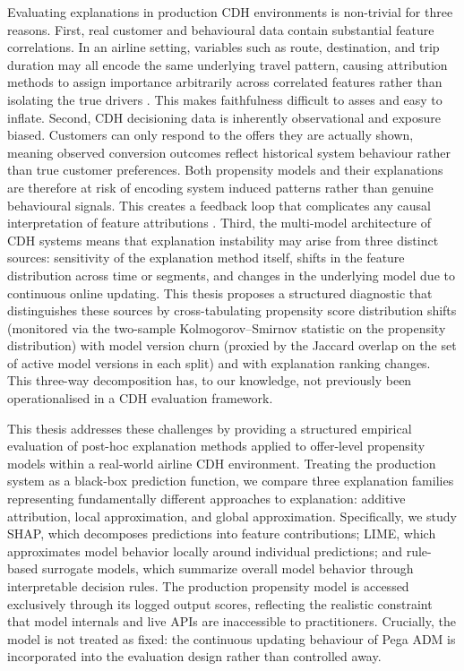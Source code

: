 \documentclass[oneside]{memoir} %
\begin{document}
Evaluating explanations in production CDH environments is non-trivial for three reasons. First, real customer and behavioural data contain substantial feature correlations. In an airline setting, variables such as route, destination, and trip duration may all encode the same underlying travel pattern, causing attribution methods to assign importance arbitrarily across correlated features rather than isolating the true drivers \parencite{lundberg_unified_2017}. This makes faithfulness difficult to asses and easy to inflate. Second, CDH decisioning data is inherently observational and exposure biased. Customers can only respond to the offers they are actually shown, meaning observed conversion outcomes reflect historical system behaviour rather than true customer preferences. Both propensity models and their explanations are therefore at risk of encoding system induced patterns rather than genuine behavioural signals. This creates a feedback loop that complicates any causal interpretation of feature attributions \parencite{lundberg_be_2018}. Third, the multi-model architecture of CDH systems means that explanation instability may arise from three distinct sources: sensitivity of the explanation method itself, shifts in the feature distribution across time or segments, and changes in the underlying model due to continuous online updating. This thesis proposes a structured diagnostic that distinguishes these sources by cross-tabulating propensity score distribution shifts (monitored via the two-sample Kolmogorov--Smirnov statistic on the propensity distribution) with model version churn (proxied by the Jaccard overlap on the set of active model versions in each split) and with explanation ranking changes. This three-way decomposition has, to our knowledge, not previously been operationalised in a CDH evaluation framework.

This thesis addresses these challenges by providing a structured empirical evaluation of post-hoc explanation methods applied to offer-level propensity models within a real-world airline CDH environment. Treating the production system as a black-box prediction function, we compare three explanation families representing fundamentally different approaches to explanation: additive attribution, local approximation, and global approximation. Specifically, we study SHAP, which decomposes predictions into feature contributions; LIME, which approximates model behavior locally around individual predictions; and rule-based surrogate models, which summarize overall model behavior through interpretable decision rules. The production propensity model is accessed exclusively through its logged output scores, reflecting the realistic constraint that model internals and live APIs are inaccessible to practitioners. Crucially, the model is not treated as fixed: the continuous updating behaviour of Pega ADM is incorporated into the evaluation design rather than controlled away.
\end{document}
